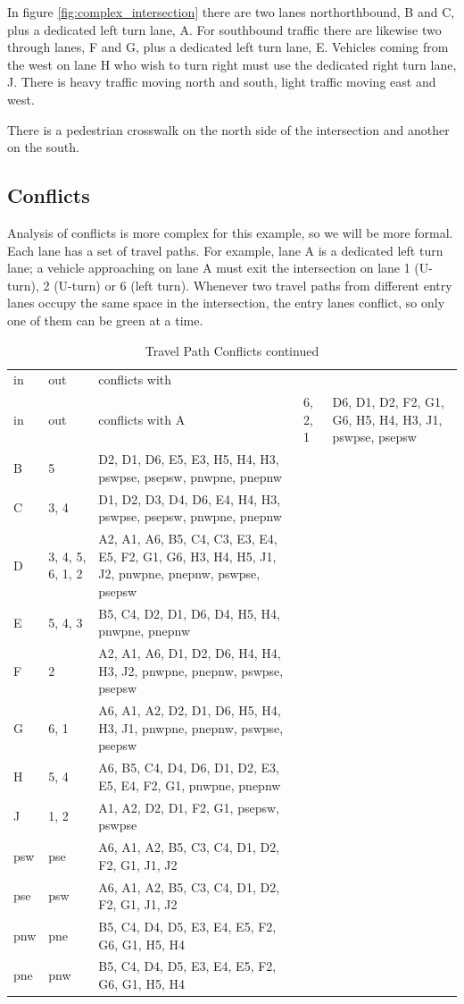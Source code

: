 \documentclass[letterpaper,twoside]{article}
\begin{document}
In figure \ref{fig:complex_intersection} there are two lanes
northorthbound, B and C, plus a dedicated left turn lane, A.
For southbound traffic there are likewise two through lanes,
F and G, plus a dedicated left turn lane, E.
Vehicles coming from the west on lane H who wish to turn right
must use the dedicated right turn lane, J.
There is heavy traffic moving north and south,
light traffic moving east and west.

There is a pedestrian crosswalk on the north side of the intersection
and another on the south.

\subsection{Conflicts}

Analysis of conflicts is more complex for this example, so we
will be more formal.  Each lane has a set of travel paths.
For example, lane A is a dedicated left turn lane; a vehicle approaching on
lane A must exit the intersection on lane 1 (U-turn), 2 (U-turn)
or 6 (left turn).  Whenever two travel paths from different entry lanes
occupy the same space in the intersection, the entry lanes
conflict, so only one of them can be green at a time.

\begin{longtable}{l |l| p{8cm}}
  \caption{Travel Path Conflicts} \\
  in & out & conflicts with \endfirsthead
  \caption{Travel Path Conflicts continued} \\
  in & out & conflicts with \endhead
  \hline
  A & 6, 2, 1 & D6, D1, D2, F2, G1, G6, H5, H4, H3, J1, pswpse, psepsw \\
  B & 5 & D2, D1, D6, E5, E3, H5, H4, H3, pswpse, psepsw, pnwpne, pnepnw \\
  C & 3, 4 & D1, D2, D3, D4, D6, E4, H4, H3, pswpse, psepsw, pnwpne, pnepnw \\
  D & 3, 4, 5, 6, 1, 2 & A2, A1, A6, B5, C4, C3, E3, E4, E5, F2, G1, G6, H3,
  H4, H5, J1, J2, pnwpne, pnepnw, pswpse, psepsw \\
  E & 5, 4, 3 & B5, C4, D2, D1, D6, D4, H5, H4, pnwpne, pnepnw  \\
  F & 2 & A2, A1, A6, D1, D2, D6, H4, H4, H3, J2, pnwpne, pnepnw, pswpse,
  psepsw \\
  G & 6, 1 & A6, A1, A2, D2, D1, D6, H5, H4, H3, J1, pnwpne, pnepnw, pswpse,
  psepsw \\
  H & 5, 4 & A6, B5, C4, D4, D6, D1, D2, E3, E5, E4, F2, G1, pnwpne, pnepnw \\
  J & 1, 2 & A1, A2, D2, D1, F2, G1, psepsw, pswpse \\
  psw & pse & A6, A1, A2, B5, C3, C4, D1, D2, F2, G1, J1, J2 \\
  pse & psw & A6, A1, A2, B5, C3, C4, D1, D2, F2, G1, J1, J2 \\
  pnw & pne & B5, C4, D4, D5, E3, E4, E5, F2, G6, G1, H5, H4 \\
  pne & pnw & B5, C4, D4, D5, E3, E4, E5, F2, G6, G1, H5, H4 \\
\end{longtable}
\end{document}

